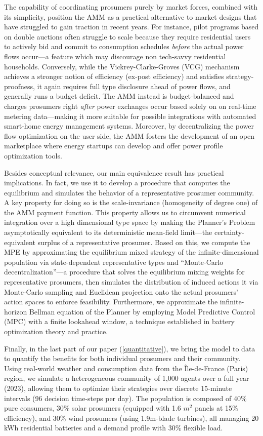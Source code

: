 \documentclass[12pt, notitlepage]{article}
\begin{document}
The capability of coordinating prosumers purely by market forces, combined with its simplicity,  position the AMM as a practical alternative to market designs that have struggled to gain traction in recent years. For instance, pilot programs based on double auctions often struggle to scale because they require residential users to actively bid and commit to consumption schedules \textit{before} the actual power flows occur---a feature which may discourage non tech-savvy residential households. Conversely, while the Vickrey-Clarke-Groves (VCG) mechanism achieves a stronger notion of efficiency (ex-post efficiency) and satisfies strategy-proofness, it again requires  full type disclosure ahead of power flows, and generally runs a budget deficit. The AMM instead is budget-balanced and charges prosumers right \textit{after} power exchanges occur based solely on on real-time metering data---making it more suitable for possible integrations with automated smart-home energy management systems. Moreover, by decentralizing the power flow optimization on the user side, the AMM fosters the development of an open marketplace where energy startups can develop and offer power profile optimization tools. 

Besides conceptual relevance, our main equivalence result has practical implications. In fact, we use it  to develop a procedure that computes the equilibrium and simulates the behavior of a representative prosumer community. A key property for doing so is the scale-invariance (homogeneity of degree one) of the AMM payment function. This property allows us to circumvent numerical integration over a high dimensional type space by making the Planner's Problem asymptotically equivalent to its deterministic mean-field limit---the certainty-equivalent surplus of a representative prosumer.  Based on this, we compute the MPE by approximating the equilibrium mixed strategy of the infinite-dimensional population via state-dependent representative types and ``Monte-Carlo decentralization''---a procedure that solves the equilibrium mixing weights for representative prosumers, then simulates the  distribution of induced actions it via Monte-Carlo sampling and Euclidean projection onto the actual prosumers' action spaces to enforce feasibility. Furthermore, we approximate the infinite-horizon Bellman equation of the Planner by employing Model Predictive Control (MPC) with a finite lookahead window, a technique established in battery optimization theory and practice.

Finally, in the last part of our paper (\cref{quantitative}), we bring the model to data to quantify the benefits for both individual prosumers and their community. Using real-world weather and consumption data from the Île-de-France (Paris) region, we simulate a heterogeneous community of 1{,}000 agents over a full year (2023), allowing them to optimize their strategies over discrete 15-minute intervals (96 decision time-steps per day). The population is composed of 40\% pure consumers, 30\% solar prosumers (equipped with 1.6 $m^2$ panels at 15\% efficiency), and 30\% wind prosumers (using 1.9m-blade turbines), all managing 20 kWh residential batteries and a demand profile with 30\% flexible load. 
\end{document}
